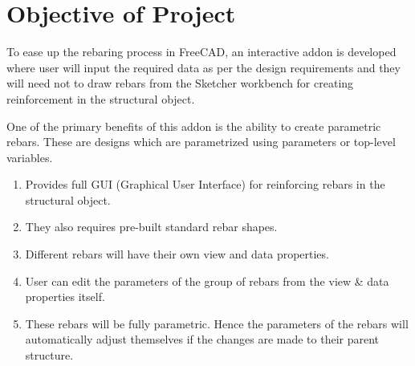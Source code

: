 \section{Objective of Project}

To ease up the rebaring process in FreeCAD, an interactive addon is developed where user will input the required data as per the design requirements and they will need not to draw rebars from the Sketcher workbench for creating reinforcement in the structural object.

One of the primary benefits of this addon is the ability to create parametric rebars. These are designs which are parametrized using parameters or top-level variables.

\begin{enumerate}
    \item Provides full GUI (Graphical User Interface) for reinforcing rebars in the structural object.
    \item They also requires pre-built standard rebar shapes.
    \item Different rebars will have their own view and data properties.
    \item User can edit the parameters of the group of rebars from the view \& data properties itself.
    \item These rebars will be fully parametric. Hence the parameters of the rebars will automatically adjust themselves if the changes are made to their parent structure.
\end{enumerate}


%  
%  

